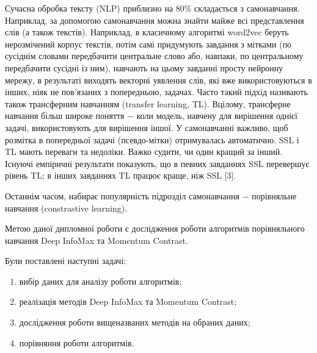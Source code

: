 Сучасна обробка тексту (NLP) приблизно на 80\% складається з самонавчання. Наприклад, за допомогою самонавчання можна знайти майже всі представлення слів (а також текстів). Наприклад, в класичному алгоритмі word2vec беруть нерозмічений корпус текстів, потім самі придумують завдання з мітками (по сусіднім словами передбачити центральне слово або, навпаки, по центральному передбачити сусідні із ним), навчають на цьому завданні просту нейронну мережу, в результаті виходять векторні уявлення слів, які вже використовуються в інших, ніяк не пов'язаних з попередньою, задачах. Часто такий підхід називають також трансферним навчанням (transfer learning, TL). Вцілому, трансферне навчання більш широке поняття $-$ коли модель, навчену для вирішення однієї задачі, використовують для вирішення іншої. У самонавчанні важливо, щоб розмітка в попередньої задачі (псевдо-мітки) отримувалась автоматично. 
SSL і TL мають переваги та недоліки. Важко судити, чи один кращий за інший. Існуючі емпіричні результати показують, що в певних завданнях SSL перевершує рівень TL; в інших завданнях TL працює краще, ніж SSL [3].



Останнім часом, набирає популярність підрозділ самонавчання $-$ порівняльне навчання (constrastive learning).

Метою даної дипломної роботи є дослідження роботи алгоритмів порівняльного навчання Deep InfoMax та Momentum Contrast.

Були поставлені наступні задачі:

\begin{enumerate}
	\item вибір даних для аналізу роботи алгоритмів;
	\item реалізація методів Deep InfoMax та Momentum Contrast;
	\item дослідження роботи вищеназваних методів на обраних даних;
	\item порівняння роботи алгоритмів.
\end{enumerate}

